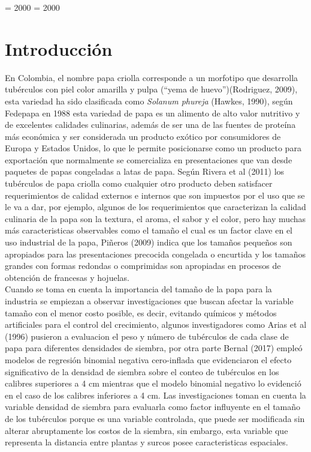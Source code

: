 \righthyphenmin = 2000
\lefthyphenmin = 2000

\chapter*{Introducci\'on}

En Colombia, el nombre papa criolla corresponde a un morfotipo que desarrolla tubérculos con piel color amarilla y pulpa ("`yema de huevo"')(Rodriguez, 2009), esta variedad ha sido clasificada como \textit{Solanum phureja} (Hawkes, 1990), según Fedepapa en 1988 esta variedad de papa es un alimento de alto valor nutritivo y de excelentes calidades culinarias, además de ser una de las fuentes de proteína más económica y ser considerada un producto exótico por consumidores de Europa y Estados Unidos, lo que le permite posicionarse como un producto para exportación que normalmente se comercializa en presentaciones que van desde paquetes de papas congeladas a latas de papa. Según Rivera et al (2011) los tubérculos de papa criolla como cualquier otro producto deben satisfacer requerimientos de calidad externos e internos que son impuestos por el uso que se le va a dar, por ejemplo, algunos de los requerimientos que caracterizan la calidad culinaria de la papa son la textura, el aroma, el sabor y el color, pero hay muchas más caracteristicas observables como el tamaño el cual es un factor clave en el uso industrial de la papa, Piñeros (2009) indica que los tamaños pequeños son apropiados para las presentaciones precocida congelada o encurtida y los tamaños grandes con formas redondas o comprimidas son apropiadas en procesos de obtención de francesas y hojuelas.\\ 

Cuando se toma en cuenta la importancia del tamaño de la papa para la industria se empiezan a observar investigaciones que buscan afectar la variable tamaño con el menor costo posible, es decir, evitando químicos y métodos artificiales para el control del crecimiento, algunos investigadores como Arias et al (1996) pusieron a evaluacion el peso y número de tubérculos de cada clase de papa para diferentes densidades de siembra, por otra parte Bernal (2017) empleó modelos de regresión binomial negativa cero-inflada que evidenciaron el efecto significativo de la densidad de siembra sobre el conteo de tubérculos en los calibres superiores a 4 cm mientras que el modelo binomial negativo lo evidenció en el caso de los calibres inferiores a 4 cm. Las investigaciones toman en cuenta la variable densidad de siembra para evaluarla como factor influyente en el tamaño de los tubérculos porque es una variable controlada, que puede ser modificada sin alterar abruptamente los costos de la siembra, sin embargo, esta variable que representa la distancia entre plantas y surcos posee caracteristicas espaciales.\\

